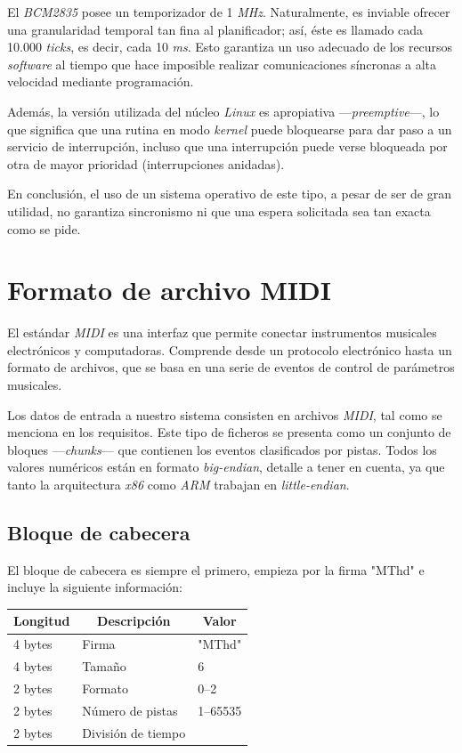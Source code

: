 El \textit{BCM2835} posee un temporizador de 1 \textit{MHz}. Naturalmente, es inviable ofrecer una granularidad temporal tan fina al planificador; así, éste es llamado cada 10.000 \textit{ticks}, es decir, cada 10 \textit{ms}. Esto garantiza un uso adecuado de los recursos \textit{software} al tiempo que hace imposible realizar comunicaciones síncronas a alta velocidad mediante programación.

Además, la versión utilizada del núcleo \textit{Linux} es apropiativa ---\textit{preemptive}---, lo que significa que una rutina en modo \textit{kernel} puede bloquearse para dar paso a un servicio de interrupción, incluso que una interrupción puede verse bloqueada por otra de mayor prioridad (interrupciones anidadas).

En conclusión, el uso de un sistema operativo de este tipo, a pesar de ser de gran utilidad, no garantiza sincronismo ni que una espera solicitada sea tan exacta como se pide.

\section{Formato de archivo MIDI}

El estándar \textit{MIDI} es una interfaz que permite conectar instrumentos musicales electrónicos y computadoras. Comprende desde un protocolo electrónico hasta un formato de archivos, que se basa en una serie de eventos de control de parámetros musicales.

Los datos de entrada a nuestro sistema consisten en archivos \textit{MIDI}, tal como se menciona en los requisitos. Este tipo de ficheros se presenta como un conjunto de bloques ---\textit{chunks}--- que contienen los eventos clasificados por pistas. Todos los valores numéricos están en formato \textit{big-endian}, detalle a tener en cuenta, ya que tanto la arquitectura \textit{x86} como \textit{ARM} trabajan en \textit{little-endian}.

\subsection{Bloque de cabecera}

El bloque de cabecera es siempre el primero, empieza por la firma "MThd" e incluye la siguiente información:

\begin{center}
	\begin{tabular}{|l|l|l|}
		\hline \multicolumn{1}{|c|}{\textbf{Longitud}} & \multicolumn{1}{c|}{\textbf{Descripción}} & \multicolumn{1}{c|}{\textbf{Valor}} \\
		\hline 4 bytes & Firma & "MThd" \\ 
		\hline 4 bytes & Tamaño & 6 \\ 
		\hline 2 bytes & Formato & 0--2 \\ 
		\hline 2 bytes & Número de pistas & 1--65535 \\ 
		\hline 2 bytes & División de tiempo &  \\ 
		\hline 
	\end{tabular} 
\end{center}

